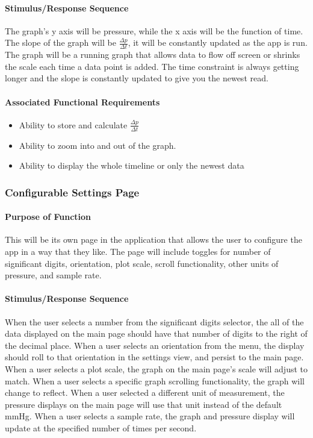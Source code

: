 \documentclass[onecolumn, draftclsnofoot,10pt, compsoc]{IEEEtran}
\begin{document}
\paragraph{Stimulus/Response Sequence}
The graph's y axis will be pressure, while the x axis will be the function of time.
The slope of the graph will be $\frac{\Delta p}{\Delta t}$, it will be constantly updated as the app is run.
The graph will be a running graph that allows data to flow off screen or shrinks the scale each time a data point is added.
The time constraint is always getting longer and the slope is constantly updated to give you the newest read.
\paragraph{Associated Functional Requirements}
\begin{itemize}
\item Ability to store and calculate $\frac{\Delta p}{\Delta t}$
\item Ability to zoom into and out of the graph.
\item Ability to display the whole timeline or only the newest data
\end{itemize}

\subsubsection{Configurable Settings Page}
\paragraph{Purpose of Function}
This will be its own page in the application that allows the user to configure the app in a way that they like.
The page will include toggles for number of significant digits, orientation, plot scale, scroll functionality, other units of pressure, and sample rate.

\paragraph{Stimulus/Response Sequence}
When the user selects a number from the significant digits selector, the all of the data displayed on the main page should have that number of digits to the right of the decimal place.
When a user selects an orientation from the menu, the display should roll to that orientation in the settings view, and persist to the main page.
When a user selects a plot scale, the graph on the main page's scale will adjust to match.
When a user selects a specific graph scrolling functionality, the graph will change to reflect.
When a user selected a different unit of measurement, the pressure displays on the main page will use that unit instead of the default mmHg.
When a user selects a sample rate, the graph and pressure display will update at the specified number of times per second.
\end{document}
